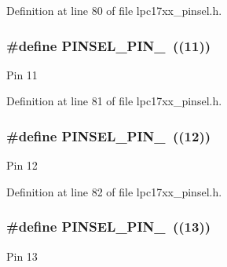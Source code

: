Definition at line 80 of file lpc17xx\+\_\+pinsel.\+h.

\subsubsection[{\texorpdfstring{P\+I\+N\+S\+E\+L\+\_\+\+P\+I\+N\+\_\+11}{PINSEL_PIN_11}}]{\setlength{\rightskip}{0pt plus 5cm}\#define P\+I\+N\+S\+E\+L\+\_\+\+P\+I\+N\+\_~((11))}\hypertarget{group___p_i_n_s_e_l___public___macros_gaf04d143c6e91c484c6d113922e8f2936}{}\label{group___p_i_n_s_e_l___public___macros_gaf04d143c6e91c484c6d113922e8f2936}
Pin 11 

Definition at line 81 of file lpc17xx\+\_\+pinsel.\+h.

\subsubsection[{\texorpdfstring{P\+I\+N\+S\+E\+L\+\_\+\+P\+I\+N\+\_\+12}{PINSEL_PIN_12}}]{\setlength{\rightskip}{0pt plus 5cm}\#define P\+I\+N\+S\+E\+L\+\_\+\+P\+I\+N\+\_~((12))}\hypertarget{group___p_i_n_s_e_l___public___macros_ga9ef4030bbae13e89349b3c3ee5e7cbe3}{}\label{group___p_i_n_s_e_l___public___macros_ga9ef4030bbae13e89349b3c3ee5e7cbe3}
Pin 12 

Definition at line 82 of file lpc17xx\+\_\+pinsel.\+h.

\subsubsection[{\texorpdfstring{P\+I\+N\+S\+E\+L\+\_\+\+P\+I\+N\+\_\+13}{PINSEL_PIN_13}}]{\setlength{\rightskip}{0pt plus 5cm}\#define P\+I\+N\+S\+E\+L\+\_\+\+P\+I\+N\+\_~((13))}\hypertarget{group___p_i_n_s_e_l___public___macros_gad10a5248395d859c7c831dd35a3ef81a}{}\label{group___p_i_n_s_e_l___public___macros_gad10a5248395d859c7c831dd35a3ef81a}
Pin 13 

